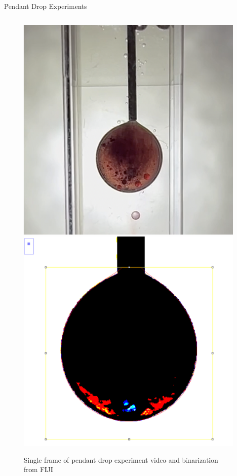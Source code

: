 \documentclass[final]{beamer}
\newlength{\colwidth}
\begin{document}
\begin{frame}[t]
\begin{columns}[t]
\begin{column}{\colwidth}
\begin{block}{Pendant Drop Experiments}
    \begin{columns}
        \begin{column}{.25\textwidth} %
            \begin{figure}
                \centering
                \includegraphics[width=\linewidth]{figures/pendantdrop.png}
                \includegraphics[width=\linewidth]{figures/binarization.png}
                \caption{Single frame of pendant drop experiment video and binarization from FIJI}
            \end{figure}
        \end{column}


\end{columns}
\end{block}
\end{column}
\end{columns}
\end{frame}
\end{document}
